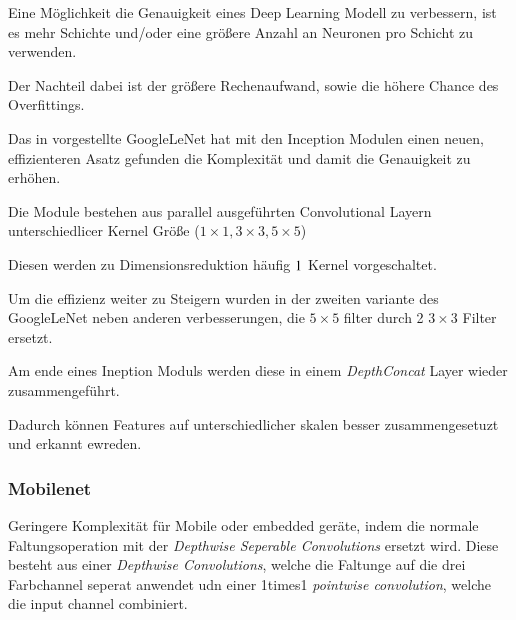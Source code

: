Eine Möglichkeit die Genauigkeit eines Deep Learning Modell 
zu verbessern, ist es mehr Schichte und/oder eine 
größere Anzahl an Neuronen pro Schicht zu verwenden.

Der Nachteil dabei ist der größere Rechenaufwand, sowie 
die höhere Chance des Overfittings.

Das in \cite{szegedyGoingDeeperConvolutions2014} vorgestellte GoogleLeNet hat mit den Inception 
Modulen einen neuen, effizienteren Asatz gefunden die 
Komplexität und damit die Genauigkeit zu erhöhen.

Die Module bestehen aus parallel ausgeführten 
Convolutional Layern unterschiedlicer Kernel 
Größe ($1\times1, 3\times3, 5\times5$)

Diesen werden zu Dimensionsreduktion häufig 
$1\time1$ Kernel vorgeschaltet.

Um die effizienz weiter zu Steigern wurden in 
der zweiten variante des GoogleLeNet
\cite{szegedyRethinkingInceptionArchitecture2015}
 neben anderen verbesserungen, die 
$ 5\times5$ filter durch 2  $3\times3$ Filter 
ersetzt.

Am ende eines Ineption Moduls werden diese 
in einem \textit{DepthConcat} Layer wieder zusammengeführt.

Dadurch können Features auf unterschiedlicher skalen 
besser zusammengesetuzt und erkannt ewreden.



\begin{minipage}{0.5\textwidth}
    \centering
    
    \label{fig:incept_modul}
\end{minipage}
\begin{minipage}{0.5\textwidth}
    \centering
    
    \label{fig:incept_modul}
\end{minipage}




\subsubsection{Mobilenet}

\cite{howardMobileNetsEfficientConvolutional2017a}

Geringere Komplexität für Mobile oder embedded geräte, indem 
die normale Faltungsoperation mit der \textit{Depthwise Seperable 
Convolutions} ersetzt wird. 
Diese besteht aus einer \textit{Depthwise  
Convolutions}, welche die Faltunge auf 
die drei Farbchannel seperat anwendet udn einer 1times1
\textit{pointwise convolution}, welche die input channel combiniert. 

